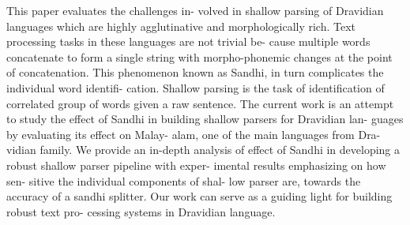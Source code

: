This paper evaluates the challenges in- volved in shallow parsing of Dravidian languages which are highly agglutinative and morphologically rich. Text processing tasks in these languages are not trivial be- cause multiple words concatenate to form a single string with morpho-phonemic changes at the point of concatenation. This phenomenon known as Sandhi, in turn complicates the individual word identifi- cation. Shallow parsing is the task of identification of correlated group of words given a raw sentence. The current work is an attempt to study the effect of Sandhi in building shallow parsers for Dravidian lan- guages by evaluating its effect on Malay- alam, one of the main languages from Dra- vidian family. We provide an in-depth analysis of effect of Sandhi in developing a robust shallow parser pipeline with exper- imental results emphasizing on how sen- sitive the individual components of shal- low parser are, towards the accuracy of a sandhi splitter. Our work can serve as a guiding light for building robust text pro- cessing systems in Dravidian language.
